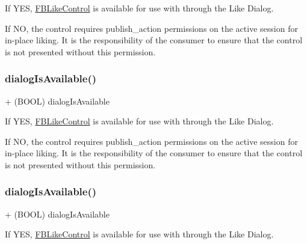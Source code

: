 If Y\+ES, \hyperlink{interfaceFBLikeControl}{F\+B\+Like\+Control} is available for use with through the Like Dialog.

If NO, the control requires publish\+\_\+action permissions on the active session for in-\/place liking. It is the responsibility of the consumer to ensure that the control is not presented without this permission. \mbox{\label{interfaceFBLikeControl_a31182182d8e02669ba4bc6cec96e9111}} 
\subsubsection{\texorpdfstring{dialog\+Is\+Available()}{dialogIsAvailable()}\hspace{0.1cm}{\footnotesize\ttfamily [3/5]}}
{\footnotesize\ttfamily + (B\+O\+OL) dialog\+Is\+Available \begin{DoxyParamCaption}{ }\end{DoxyParamCaption}}

If Y\+ES, \hyperlink{interfaceFBLikeControl}{F\+B\+Like\+Control} is available for use with through the Like Dialog.

If NO, the control requires publish\+\_\+action permissions on the active session for in-\/place liking. It is the responsibility of the consumer to ensure that the control is not presented without this permission. \mbox{\label{interfaceFBLikeControl_a31182182d8e02669ba4bc6cec96e9111}} 
\subsubsection{\texorpdfstring{dialog\+Is\+Available()}{dialogIsAvailable()}\hspace{0.1cm}{\footnotesize\ttfamily [4/5]}}
{\footnotesize\ttfamily + (B\+O\+OL) dialog\+Is\+Available \begin{DoxyParamCaption}{ }\end{DoxyParamCaption}}

If Y\+ES, \hyperlink{interfaceFBLikeControl}{F\+B\+Like\+Control} is available for use with through the Like Dialog.

